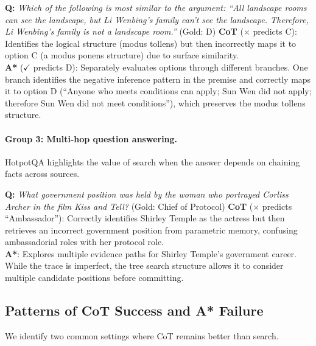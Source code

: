 \documentclass{article}
\begin{document}
\begin{examplebox}[title=LogicQA --- Hypothesis Elimination]
\textbf{Q:} \emph{Which of the following is most similar to the argument: ``All landscape rooms can see the landscape, but Li Wenbing's family can't see the landscape. Therefore, Li Wenbing's family is not a landscape room.''} \quad (Gold: D)
\tcblower
\textbf{CoT} ($\times$ predicts C): Identifies the logical structure (modus tollens) but then incorrectly maps it to option C (a modus ponens structure) due to surface similarity.\\[4pt]
\textbf{A*} ($\checkmark$ predicts D): Separately evaluates options through different branches. One branch identifies the negative inference pattern in the premise and correctly maps it to option D (``Anyone who meets conditions can apply; Sun Wen did not apply; therefore Sun Wen did not meet conditions''), which preserves the modus tollens structure.
\end{examplebox}

\paragraph{Group 3: Multi-hop question answering.}
HotpotQA highlights the value of search when the answer depends on chaining facts across sources.

\begin{examplebox}[title=HotpotQA --- Multi-hop Chaining]
\textbf{Q:} \emph{What government position was held by the woman who portrayed Corliss Archer in the film \textit{Kiss and Tell}?} \quad (Gold: Chief of Protocol)
\tcblower
\textbf{CoT} ($\times$ predicts ``Ambassador''): Correctly identifies Shirley Temple as the actress but then retrieves an incorrect government position from parametric memory, confusing ambassadorial roles with her protocol role.\\[4pt]
\textbf{A*}: Explores multiple evidence paths for Shirley Temple's government career. While the trace is imperfect, the tree search structure allows it to consider multiple candidate positions before committing.
\end{examplebox}

\subsection{Patterns of CoT Success and A* Failure}
\label{app:cot_success}

We identify two common settings where CoT remains better than search.
\end{document}

